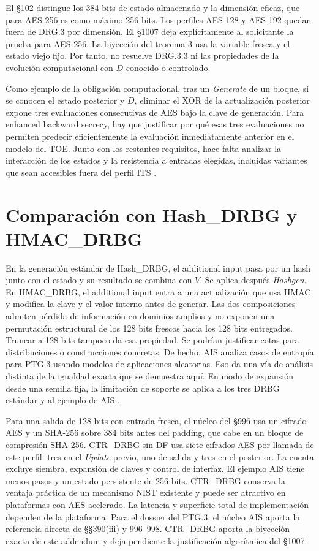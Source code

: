 \documentclass[11pt,a4paper]{article}
\begin{document}
El §102 distingue los 384 bits de estado almacenado y la
dimensión eficaz, que para AES-256 es como máximo 256 bits.
Los perfiles AES-128 y AES-192 quedan fuera de DRG.3 por
dimensión. El §1007 deja explícitamente al solicitante
la prueba para AES-256. La biyección del teorema 3 usa la
variable fresca y el estado viejo fijo. Por tanto, no
resuelve DRG.3.3 ni las propiedades de la evolución
computacional con $D$ conocido o controlado.

Como ejemplo de la obligación computacional, tras un
\emph{Generate} de un bloque, si se conocen el estado
posterior y $D$, eliminar el XOR de la actualización
posterior expone tres evaluaciones consecutivas de AES
bajo la clave de generación. Para enhanced backward secrecy,
hay que justificar por qué esas tres evaluaciones no
permiten predecir eficientemente la evaluación inmediatamente
anterior en el modelo del TOE. Junto con los restantes
requisitos, hace falta analizar la interacción de los estados
y la resistencia a entradas elegidas, incluidas variantes
que sean accesibles fuera del perfil ITS
\cite[§§102, 207, 211--214, 380 y 1007]{ais}\cite[§10.2.1.5.1]{nist}.

\section{Comparación con Hash\_DRBG y HMAC\_DRBG}

En la generación estándar de Hash\_DRBG, el additional input
pasa por un hash junto con el estado y su resultado se combina
con $V$. Se aplica después \emph{Hashgen}. En HMAC\_DRBG,
el additional input entra a una actualización que usa HMAC y
modifica la clave y el valor interno antes de generar.
Las dos composiciones admiten pérdida de información en
dominios amplios y no exponen una permutación estructural
de los 128 bits frescos hacia los 128 bits entregados.
Truncar a 128 bits tampoco da esa propiedad. Se podrían
justificar cotas para distribuciones o construcciones
concretas. De hecho, AIS analiza casos de entropía para
PTG.3 usando modelos de aplicaciones aleatorias.
Eso da una vía de análisis distinta de la igualdad exacta
que se demuestra aquí. En modo de expansión desde una
semilla fija, la limitación de soporte se aplica a los tres
DRBG estándar y al ejemplo de AIS
\cite[§§392--394, 404--413, 1006--1008]{ais}\cite[§§10.1.1--10.1.2]{nist}.

Para una salida de 128 bits con entrada fresca, el núcleo
del §996 usa un cifrado AES y un SHA-256 sobre 384 bits antes
del padding, que cabe en un bloque de compresión SHA-256.
CTR\_DRBG sin DF usa siete cifrados AES por llamada de este
perfil: tres en el \emph{Update} previo, uno de salida y
tres en el posterior. La cuenta excluye siembra,
expansión de claves y control de interfaz. El ejemplo AIS
tiene menos pasos y un estado persistente de 256 bits.
CTR\_DRBG conserva la ventaja práctica de un mecanismo
NIST existente y puede ser atractivo en plataformas
con AES acelerado. La latencia y superficie total de
implementación dependen de la plataforma. Para el dossier
del PTG.3, el núcleo AIS aporta la referencia directa de
§§390(iii) y 996--998. CTR\_DRBG aporta la biyección
exacta de este addendum y deja pendiente la justificación
algorítmica del §1007.
\end{document}
